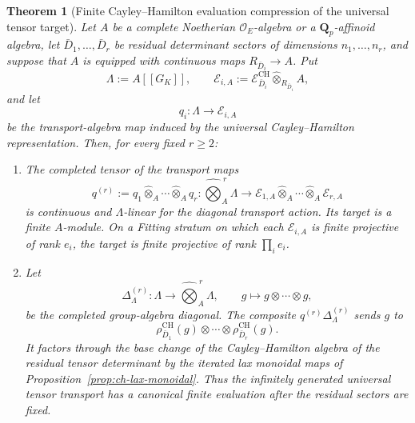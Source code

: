 \documentclass[11pt]{article}
\newtheorem{theorem}{Theorem}[section]
\theoremstyle{definition}
\newcommand{\Qp}{\mathbf Q_p}
\begin{document}
\begin{theorem}[Finite Cayley--Hamilton evaluation compression of the universal tensor target]\label{thm:ch-tensor-evaluation-compression}
Let $A$ be a complete Noetherian $\mathcal O_E$-algebra or a $\Qp$-affinoid algebra, let
$\bar D_1,\ldots,\bar D_r$ be residual determinant sectors of dimensions
$n_1,\ldots,n_r$, and suppose that $A$ is equipped with continuous maps
$R_{\bar D_i}\to A$.  Put
\[
 \Lambda:=A[[G_K]],
 \qquad
 \mathcal E_{i,A}:=
 \mathcal E^{\mathrm{CH}}_{\bar D_i}
 \widehat\otimes_{R_{\bar D_i}}A,
\]
and let
\[
 q_i:\Lambda\longrightarrow \mathcal E_{i,A}
\]
be the transport-algebra map induced by the universal Cayley--Hamilton
representation.  Then, for every fixed $r\ge2$:
\begin{enumerate}[label=\textnormal{(\roman*)}]
\item The completed tensor of the transport maps
\begin{equation}\label{eq:ch-finite-tensor-evaluation-map}
 q^{(r)}:=q_1\widehat\otimes_A\cdots\widehat\otimes_A q_r:
 \widehat{\bigotimes}_A^{\,r}\Lambda
 \longrightarrow
 \mathcal E_{1,A}\widehat\otimes_A\cdots\widehat\otimes_A\mathcal E_{r,A}
\end{equation}
is continuous and $\Lambda$-linear for the diagonal transport action.  Its
target is a finite $A$-module.  On a Fitting stratum on which each
$\mathcal E_{i,A}$ is finite projective of rank $e_i$, the target is finite
projective of rank $\prod_i e_i$.

\item Let
\[
 \Delta_\Lambda^{(r)}:\Lambda\longrightarrow
 \widehat{\bigotimes}_A^{\,r}\Lambda,
 \qquad
 g\longmapsto g\otimes\cdots\otimes g,
\]
be the completed group-algebra diagonal.  The composite
$q^{(r)}\Delta_\Lambda^{(r)}$ sends $g$ to
\[
 \rho^{\mathrm{CH}}_{\bar D_1}(g)\otimes\cdots\otimes
 \rho^{\mathrm{CH}}_{\bar D_r}(g).
\]
It factors through the base change of the Cayley--Hamilton algebra of the
residual tensor determinant by the iterated lax monoidal maps of
Proposition~\ref{prop:ch-lax-monoidal}.  Thus the infinitely generated
universal tensor transport has a canonical finite evaluation after the
residual sectors are fixed.


\end{enumerate}
\end{theorem}
\end{document}
